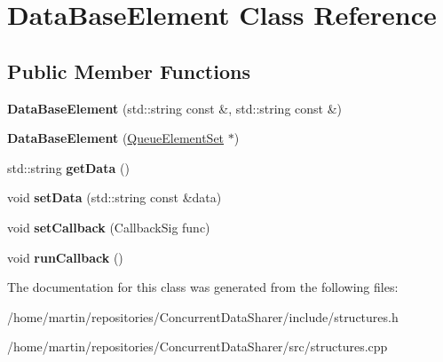 \hypertarget{classDataBaseElement}{}\section{Data\+Base\+Element Class Reference}
\label{classDataBaseElement}
\subsection*{Public Member Functions}
\begin{DoxyCompactItemize}
\item 
{\bfseries Data\+Base\+Element} (std\+::string const \&, std\+::string const \&)\hypertarget{classDataBaseElement_a253e80879bd04adf40df9d6f1b7828d2}{}\label{classDataBaseElement_a253e80879bd04adf40df9d6f1b7828d2}

\item 
{\bfseries Data\+Base\+Element} (\hyperlink{classQueueElementSet}{Queue\+Element\+Set} $\ast$)\hypertarget{classDataBaseElement_a0e0232a59e6f85e420762f078131279a}{}\label{classDataBaseElement_a0e0232a59e6f85e420762f078131279a}

\item 
std\+::string {\bfseries get\+Data} ()\hypertarget{classDataBaseElement_a2fd512bc7a9f6b1ff64a3bc8f7fdc897}{}\label{classDataBaseElement_a2fd512bc7a9f6b1ff64a3bc8f7fdc897}

\item 
void {\bfseries set\+Data} (std\+::string const \&data)\hypertarget{classDataBaseElement_ae818fb7eec2c99d68c02526de1db08a9}{}\label{classDataBaseElement_ae818fb7eec2c99d68c02526de1db08a9}

\item 
void {\bfseries set\+Callback} (Callback\+Sig func)\hypertarget{classDataBaseElement_a84795ff4c0468accc666c72f22ccc021}{}\label{classDataBaseElement_a84795ff4c0468accc666c72f22ccc021}

\item 
void {\bfseries run\+Callback} ()\hypertarget{classDataBaseElement_a07826cebc0083bd9004e5fbc8cf618b1}{}\label{classDataBaseElement_a07826cebc0083bd9004e5fbc8cf618b1}

\end{DoxyCompactItemize}


The documentation for this class was generated from the following files\+:\begin{DoxyCompactItemize}
\item 
/home/martin/repositories/\+Concurrent\+Data\+Sharer/include/structures.\+h\item 
/home/martin/repositories/\+Concurrent\+Data\+Sharer/src/structures.\+cpp\end{DoxyCompactItemize}

